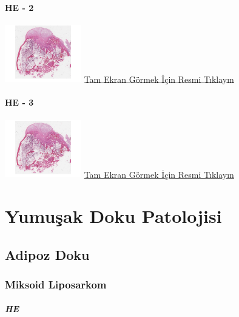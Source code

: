 \documentclass[
  letterpaper,
  DIV=11,
  numbers=noendperiod]{scrreprt}
\begin{document}
\hypertarget{he---2-4}{%
\subsection{HE - 2}\label{he---2-4}}

\href{https://images.patolojiatlasi.com/exostosis/HE.html}{\includegraphics[width=0.25\textwidth,height=\textheight]{./screenshots/thumbnail_exostosis-2.png}}
\href{https://images.patolojiatlasi.com/exostosis/oc001.html}{Tam Ekran
Görmek İçin Resmi Tıklayın}

\hypertarget{he---3-3}{%
\subsection{HE - 3}\label{he---3-3}}

\href{https://images.patolojiatlasi.com/exostosis/oc002.html}{\includegraphics[width=0.25\textwidth,height=\textheight]{./screenshots/thumbnail_exostosis-3.png}}
\href{https://images.patolojiatlasi.com/exostosis/oc002.html}{Tam Ekran
Görmek İçin Resmi Tıklayın}

\part{Yumuşak Doku Patolojisi}

\hypertarget{sec-adipoz-doku}{%
\chapter{Adipoz Doku}\label{sec-adipoz-doku}}

\hypertarget{sec-miksoid-liposarkom}{%
\section{Miksoid Liposarkom}\label{sec-miksoid-liposarkom}}

\hypertarget{he-11}{%
\subsubsection{HE}\label{he-11}}
\end{document}
